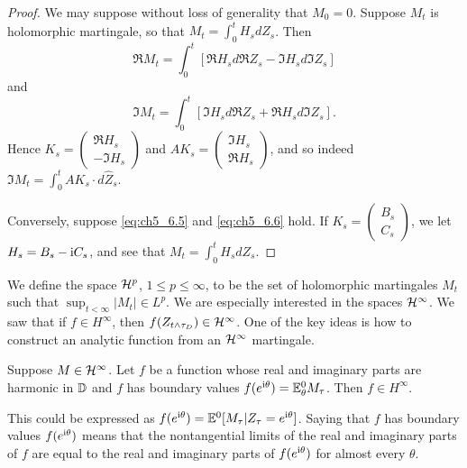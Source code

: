 \begin{proof}
We may suppose without loss of generality that $M_0 = 0$. Suppose $M_t$ is holomorphic martingale, so that $M_t = \int_0^t H_s dZ_s$. Then
\mpagebreak
\[
    \Re M_t = \int_0^t [\Re H_s d\Re Z_s - \Im H_s d\Im Z_s]
\]
and
\[
    \Im M_t = \int_0^t [\Im H_s d\Re Z_s + \Re H_s d\Im Z_s].
\]
Hence $K_s = \begin{pmatrix} \Re H_s \\ -\Im H_s \end{pmatrix}$ and $AK_s = \begin{pmatrix} \Im H_s \\ \Re H_s \end{pmatrix}$, and so indeed $\Im M_t = \int_0^t AK_s \cdot d\widehat{Z}_s$.

Conversely, suppose \eqref{eq:ch5_6.5} and \eqref{eq:ch5_6.6} hold. If $K_s = \begin{pmatrix} B_s \\ C_s \end{pmatrix}$, we let $H_s = B_s - \mathrm{i} C_s$, and see that $M_t = \int_0^t H_s dZ_s$.
\end{proof}

We define the space $\mathcal{H}^p$, $1 \leq p \leq \infty$, to be the set of holomorphic martingales $M_t$ such that $\sup_{t<\infty} |M_t| \in L^p$. We are especially interested in the spaces $\mathcal{H}^\infty$. We saw that if $f \in H^\infty$, then $f(Z_{t\wedge\tau_D}) \in \mathcal{H}^\infty$. One of the key ideas is how to construct an analytic function from an $\mathcal{H}^\infty$ martingale.


\begin{proposition}\label{prop:ch5_6.6}
Suppose $M \in \mathcal{H}^\infty$. Let $f$ be a function whose real and imaginary parts are harmonic in $\mathbb{D}$ and $f$ has boundary values $f(e^{\mathrm{i}\theta}) = \mathbb{E}_\theta^0M_\tau$. Then $f \in H^\infty$.
\end{proposition}

This could be expressed as $f(e^{\mathrm{i}\theta}) = \mathbb{E}^0[M_\tau| Z_\tau = e^{\mathrm{i}\theta}]$. Saying that $f$ has boundary values $f(e^{\mathrm{i}\theta})$ means that the nontangential limits of the real and imaginary parts of $f$ are equal to the real and imaginary parts of $f(e^{\mathrm{i}\theta})$ for almost every $\theta$.


